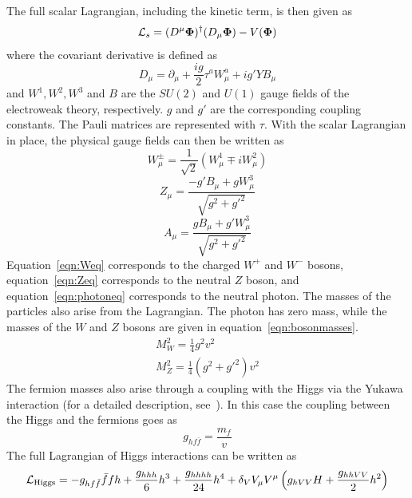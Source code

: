 %
The full scalar Lagrangian, including the kinetic term, is then given as 
%
\begin{equation}
\mathcal{L}_s = (D^\mu \mathbf{\Phi})^\dagger(D_\mu\mathbf{\Phi}) - V(\mathbf{\Phi})
\end{equation}
%
where the covariant derivative is defined as 
%
\begin{equation}
D_\mu = \partial_\mu + \frac{ig}{2}\tau^aW_\mu^a + ig'YB_\mu
\end{equation}
%
and $W^1, W^2, W^3$ and $B$ are the $SU(2)$ and $U(1)$ gauge fields of the electroweak theory, respectively. $g$ and $g'$ are the corresponding coupling constants. The Pauli matrices are represented with $\tau$. With the scalar Lagrangian in place, the physical gauge fields can then be written as 
%
\begin{equation}
\label{eqn:Weq}
W_\mu^\pm = \frac{1}{\sqrt{2}}(W_\mu^1 \mp iW_\mu^2) 
\end{equation}
%
\begin{equation}
\label{eqn:Zeq}
Z_\mu = \frac{-g'B_\mu + gW_\mu^3}{\sqrt{g^2 + g'^2}} 
\end{equation}
%
\begin{equation}
\label{eqn:photoneq}
A_\mu = \frac{gB_\mu + g'W_\mu^3}{\sqrt{g^2 + g'^2}}
\end{equation}
%
Equation~\ref{eqn:Weq} corresponds to the charged $W^+$ and $W^-$ bosons, equation~\ref{eqn:Zeq} corresponds to the neutral $Z$ boson, and equation~\ref{eqn:photoneq} corresponds to the neutral photon. The masses of the particles also arise from the Lagrangian. The photon has zero mass, while the masses of the $W$ and $Z$ bosons are given in equation~\ref{eqn:bosonmasses}.
%
\begin{equation}
\label{eqn:bosonmasses}
\begin{array}{c}
M_W^2 = \frac{1}{4}g^2v^2 \\ 
M_Z^2 = \frac{1}{4}(g^2 + g'^2)v^2
\end{array}
\end{equation}
%
The fermion masses also arise through a coupling with the Higgs via the Yukawa interaction (for a detailed description, see~\cite{Dawson}). In this case the coupling between the Higgs and the fermions goes as 
%
\begin{equation}
\label{eqn:higgs-fermions}
g_{hf\bar{f}} = \frac{m_f}{v}
\end{equation} 
%
The full Lagrangian of Higgs interactions can be written as 
%
\begin{equation}
\label{eqn:Higgs_L}
\mathcal{L}_{\rm Higgs} = -g_{hf\bar{f}}\bar{f}fh + \frac{g_{hhh}}{6}h^3 + \frac{g_{hhhh}}{24}h^4 + \delta_V V_\mu V^\mu\left(g_{hVV} H + \frac{g_{hhVV}}{2}h^2\right)
\end{equation}

